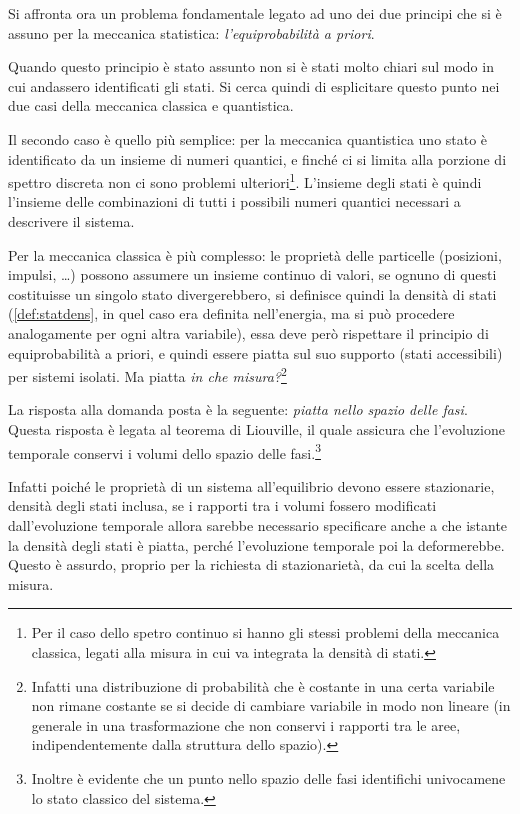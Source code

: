 Si affronta ora un problema fondamentale legato ad uno dei due principi che si è assuno per la meccanica statistica: \textit{l'equiprobabilità a priori}.
\newline

Quando questo principio è stato assunto non si è stati molto chiari sul modo in cui andassero identificati gli stati. Si cerca quindi di esplicitare questo punto nei due casi della meccanica classica e quantistica.

Il secondo caso è quello più semplice: per la meccanica quantistica uno stato è identificato da un insieme di numeri quantici, e finché ci si limita alla porzione di spettro discreta non ci sono problemi ulteriori\footnote{Per il caso dello spetro continuo si hanno gli stessi problemi della meccanica classica, legati alla misura in cui va integrata la densità di stati.}. L'insieme degli stati è quindi l'insieme delle combinazioni di tutti i possibili numeri quantici necessari a descrivere il sistema.

Per la meccanica classica è più complesso: le proprietà delle particelle (posizioni, impulsi, \dots) possono assumere un insieme continuo di valori, se ognuno di questi costituisse un singolo stato divergerebbero, si definisce quindi la densità di stati (\cref{def:statdens}, in quel caso era definita nell'energia, ma si può procedere analogamente per ogni altra variabile), essa deve però rispettare il principio di equiprobabilità a priori, e quindi essere piatta sul suo supporto (stati accessibili) per sistemi isolati. Ma piatta \textit{in che misura?}\footnote{Infatti una distribuzione di probabilità che è costante in una certa variabile non rimane costante se si decide di cambiare variabile in modo non lineare (in generale in una trasformazione che non conservi i rapporti tra le aree, indipendentemente dalla struttura dello spazio).}
\newline

La risposta alla domanda posta è la seguente: \textit{piatta nello spazio delle fasi}. Questa risposta è legata al teorema di Liouville, il quale assicura che l'evoluzione temporale conservi i volumi dello spazio delle fasi.\footnote{Inoltre è evidente che un punto nello spazio delle fasi identifichi univocamene lo stato classico del sistema.} 

Infatti poiché le proprietà di un sistema all'equilibrio devono essere stazionarie, densità degli stati inclusa, se i rapporti tra i volumi fossero modificati dall'evoluzione temporale allora sarebbe necessario specificare anche a che istante la densità degli stati è piatta, perché l'evoluzione temporale poi la deformerebbe. Questo è assurdo, proprio per la richiesta di stazionarietà, da cui la scelta della misura.
\newline

